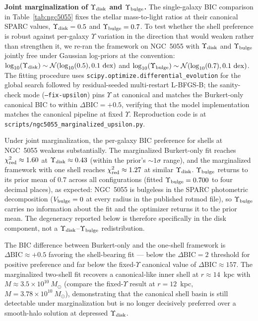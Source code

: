 \documentclass[linenumbers]{aastex701}
\newcommand{\Yt}{\Upsilon}
\newcommand{\Ydisk}{\Upsilon_{\rm disk}}
\newcommand{\Ybulge}{\Upsilon_{\rm bulge}}
\newcommand{\Vbulge}{V_{\rm bulge}}
\newcommand{\Msun}{M_\odot}
\newcommand{\chired}{\chi^2_{\rm red}}
\begin{document}
\textbf{Joint marginalization of $\Ydisk$ and $\Ybulge$.} The single-galaxy BIC comparison in Table~\ref{tab:ngc5055} fixes the stellar mass-to-light ratios at their canonical SPARC values, $\Ydisk = 0.5$ and $\Ybulge = 0.7$. To test whether the shell preference is robust against per-galaxy $\Yt$ variation in the direction that would weaken rather than strengthen it, we re-ran the framework on NGC~5055 with $\Ydisk$ and $\Ybulge$ jointly free under Gaussian log-priors at the \citet{Li2020} convention: $\log_{10}(\Ydisk) \sim \mathcal{N}(\log_{10}(0.5), 0.1~\mathrm{dex})$ and $\log_{10}(\Ybulge) \sim \mathcal{N}(\log_{10}(0.7), 0.1~\mathrm{dex})$. The fitting procedure uses \texttt{scipy.optimize.differential\_evolution} for the global search followed by residual-seeded multi-restart L-BFGS-B; the sanity-check mode (\texttt{--fix-upsilon}) pins $\Yt$ at canonical and matches the Burkert-only canonical BIC to within $\Delta\mathrm{BIC} = +0.5$, verifying that the model implementation matches the canonical pipeline at fixed $\Yt$. Reproduction code is at \texttt{scripts/ngc5055\_marginalized\_upsilon.py}.

Under joint marginalization, the per-galaxy BIC preference for shells at NGC~5055 weakens substantially. The marginalized Burkert-only fit reaches $\chired \approx 1.60$ at $\Ydisk \approx 0.43$ (within the prior's $\sim 1\sigma$ range), and the marginalized framework with one shell reaches $\chired \approx 1.27$ at similar $\Ydisk$. $\Ybulge$ returns to its prior mean of $0.7$ across all configurations (fitted $\Ybulge = 0.700$ to four decimal places), as expected: NGC~5055 is bulgeless in the SPARC photometric decomposition ($\Vbulge = 0$ at every radius in the published rotmod file), so $\Ybulge$ carries no information about the fit and the optimizer returns it to the prior mean. The degeneracy reported below is therefore specifically in the disk component, not a $\Ydisk$--$\Ybulge$ redistribution.

The BIC difference between Burkert-only and the one-shell framework is $\Delta\mathrm{BIC} \approx +0.5$ favoring the shell-bearing fit --- below the $\Delta\mathrm{BIC} = 2$ threshold for positive preference and far below the fixed-$\Yt$ canonical value of $\Delta\mathrm{BIC} \approx 157$. The marginalized two-shell fit recovers a canonical-like inner shell at $r \approx 14$~kpc with $M \approx 3.5 \times 10^{10}~\Msun$ (compare the fixed-$\Yt$ result at $r = 12$~kpc, $M = 3.78 \times 10^{10}~\Msun$), demonstrating that the canonical shell basin is still detectable under marginalization but is no longer decisively preferred over a smooth-halo solution at depressed $\Ydisk$.
\end{document}
